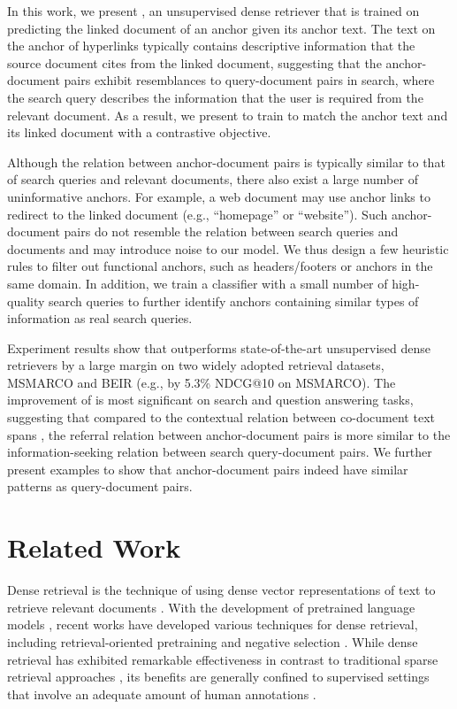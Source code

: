 In this work, we present \anchordrours, an unsupervised dense retriever that is trained on predicting the linked document of an anchor given its anchor text.
The text on the anchor of hyperlinks typically contains descriptive information that the source document cites from the linked document, 
suggesting that the anchor-document pairs exhibit resemblances to query-document pairs in search, where the search query describes the information that the user is required from the relevant document.
As a result, we present to train \anchordrours to match the anchor text and its linked document with a contrastive objective.

Although the relation between anchor-document pairs is typically similar to that of search queries and relevant documents, there also exist a large number of uninformative anchors.
For example, a web document may use anchor links to redirect to the linked document (e.g., ``homepage'' or ``website''). 
Such anchor-document pairs do not resemble the relation between search queries and documents and may introduce noise to our model.
We thus design a few heuristic rules to filter out functional anchors, such as headers/footers or anchors in the same domain.
In addition, we train a classifier with a small number of high-quality search queries to further identify anchors containing similar types of information as real search queries.

Experiment results show that \anchordrours outperforms state-of-the-art unsupervised dense retrievers by a large margin on two widely adopted retrieval datasets, MSMARCO \cite{MSMARCO} and BEIR \cite{beir} (e.g., by 5.3\% NDCG@10 on MSMARCO).
The improvement of \anchordrours is most significant on search and question answering tasks, suggesting that compared to the contextual relation between co-document text spans \cite{cocondenser,contriever}, the referral relation between anchor-document pairs is more similar to the information-seeking relation between search query-document pairs.
We further present examples to show that anchor-document pairs indeed have similar patterns as query-document pairs.




\section{Related Work}
Dense retrieval is the technique of using dense vector representations of text to retrieve relevant documents \cite{Deerwester1990IndexingBL,DSSM}. 
With the development of pretrained language models \cite{DPR,BERT}, recent works have developed various techniques for dense retrieval, including retrieval-oriented pretraining \cite{COCOLM,cocondenser,contriever} and negative selection \cite{ANCE}.
While dense retrieval has exhibited remarkable effectiveness in contrast to traditional sparse retrieval approaches \cite{BM25}, its benefits are generally confined to supervised settings that involve an adequate amount of human annotations \cite{beir}.


